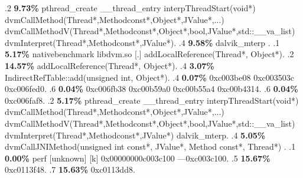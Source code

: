 \begin{profile}
{.2 \textbf{9.73\%} pthread\_create\newline {} \_\_thread\_entry\newline {} interpThreadStart(void*)\newline {} dvmCallMethod(Thread*,Methodconst*,Object*,JValue*,...)\newline {} dvmCallMethodV(Thread*,Methodconst*,Object*,bool,JValue*,std::\_\_va\_list)\newline {} dvmInterpret(Thread*,Methodconst*,JValue*). 
.4 \textbf{9.58\%} dalvik\_mterp\newline {} . 
.1 \textbf{ 5.17\%} nativebenchmark  libdvm.so              [.] addLocalReference(Thread*, Object*). 
.2 \textbf{14.57\%} addLocalReference(Thread*, Object*). 
.4 \textbf{3.07\%} IndirectRefTable::add(unsigned int, Object*). 
.4 \textbf{0.07\%} 0xc003be08\newline {} 0xc003503c\newline {} 0xc006fed0. 
.6 \textbf{0.04\%} 0xc006fb38\newline {} 0xc00b59a0\newline {} 0xc00b55a4\newline {} 0xc00b4314. 
.6 \textbf{0.04\%} 0xc006faf8. 
.2 \textbf{5.17\%} pthread\_create\newline {} \_\_thread\_entry\newline {} interpThreadStart(void*)\newline {} dvmCallMethod(Thread*,Methodconst*,Object*,JValue*,...)\newline {} dvmCallMethodV(Thread*,Methodconst*,Object*,bool,JValue*,std::\_\_va\_list)\newline {} dvmInterpret(Thread*,Methodconst*,JValue*)\newline {} dalvik\_mterp. 
.4 \textbf{5.05\%} dvmCallJNIMethod(unsigned int const*, JValue*, Method const*, Thread*)\newline {} . 
.1 \textbf{ 0.00\%} perf             [unknown]              [k] 0x00000000c003c100\newline {} ---0xc003c100. 
.5 \textbf{15.67\%} 0xc0113f48. 
.7 \textbf{15.63\%} 0xc0113dd8. 
}
\end{profile}
